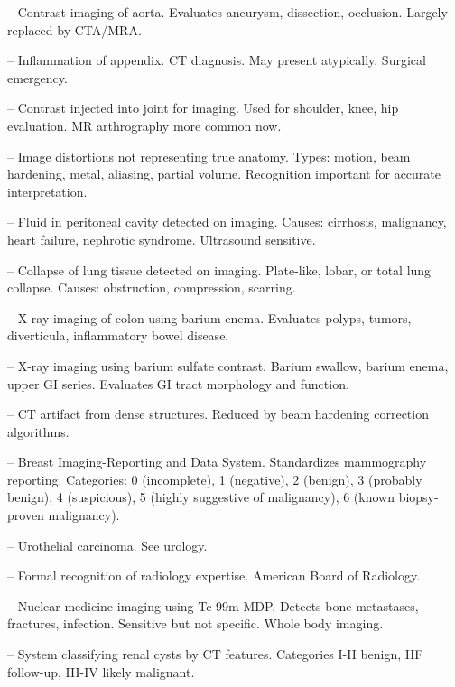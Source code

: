 -- Contrast imaging of aorta. Evaluates aneurysm, dissection, occlusion. Largely replaced by CTA/MRA.


-- Inflammation of appendix. CT diagnosis. May present atypically. Surgical emergency.


-- Contrast injected into joint for imaging. Used for shoulder, knee, hip evaluation. MR arthrography more common now.

-- Image distortions not representing true anatomy. Types: motion, beam hardening, metal, aliasing, partial volume. Recognition important for accurate interpretation.

-- Fluid in peritoneal cavity detected on imaging. Causes: cirrhosis, malignancy, heart failure, nephrotic syndrome. Ultrasound sensitive.

-- Collapse of lung tissue detected on imaging. Plate-like, lobar, or total lung collapse. Causes: obstruction, compression, scarring.

-- X-ray imaging of colon using barium enema. Evaluates polyps, tumors, diverticula, inflammatory bowel disease.

-- X-ray imaging using barium sulfate contrast. Barium swallow, barium enema, upper GI series. Evaluates GI tract morphology and function.

-- CT artifact from dense structures. Reduced by beam hardening correction algorithms.

-- Breast Imaging-Reporting and Data System. Standardizes mammography reporting. Categories: 0 (incomplete), 1 (negative), 2 (benign), 3 (probably benign), 4 (suspicious), 5 (highly suggestive of malignancy), 6 (known biopsy-proven malignancy).

-- Urothelial carcinoma. See \hyperlink{Urology}{urology}.

-- Formal recognition of radiology expertise. American Board of Radiology.

-- Nuclear medicine imaging using Tc-99m MDP. Detects bone metastases, fractures, infection. Sensitive but not specific. Whole body imaging.

-- System classifying renal cysts by CT features. Categories I-II benign, IIF follow-up, III-IV likely malignant.

